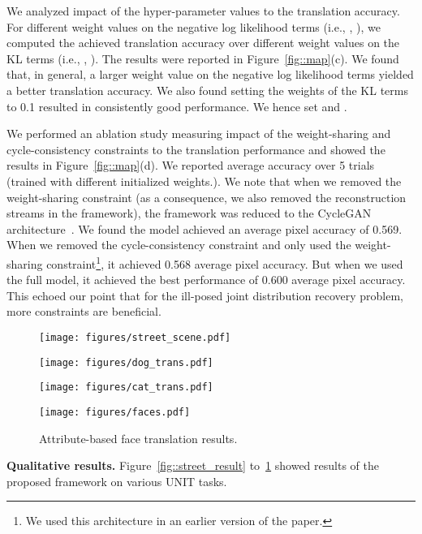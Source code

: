 \documentclass{article}
\begin{document}
We analyzed impact of the hyper-parameter values to the translation accuracy. For different weight values on the negative log likelihood terms (i.e., , ), we computed the achieved translation accuracy over different weight values on the KL terms (i.e., , ). The results were reported in Figure~\ref{fig::map}(c). We found that, in general, a larger weight value on the negative log likelihood terms yielded a better translation accuracy. We also found setting the weights of the KL terms to 0.1 resulted in consistently good performance. We hence set  and .

We performed an ablation study measuring impact of the weight-sharing and cycle-consistency constraints to the translation performance and showed the results in Figure~\ref{fig::map}(d). We reported average accuracy over 5 trials (trained with different initialized weights.). We note that when we removed the weight-sharing constraint (as a consequence, we also removed the reconstruction streams in the framework), the framework was reduced to the CycleGAN architecture~\cite{zhu2017unpaired,kim2017learning}. We found the model achieved an average pixel accuracy of 0.569. When we removed the cycle-consistency constraint and only used the weight-sharing constraint\footnote{We used this architecture in an earlier version of the paper.}, it achieved 0.568 average pixel accuracy. But when we used the full model, it achieved the best performance of 0.600 average pixel accuracy. This echoed our point that for the ill-posed joint distribution recovery problem, more constraints are beneficial.

\begin{figure}
\centering
\texttt{[image: figures/street\_scene.pdf]}
\vspace{-2mm}
\caption{\small Street scene image translation results. For each pair, left is input and right is the translated image.}
\label{fig::street_result}
\texttt{[image: figures/dog\_trans.pdf]}
\caption{\small Dog breed translation results.}
\label{fig::dog_result}
\texttt{[image: figures/cat\_trans.pdf]}
\caption{\small Cat species translation results.}
\label{fig::cat_result}
\texttt{[image: figures/faces.pdf]}
\caption{\small Attribute-based face translation results.}
\label{fig::face_result}
\end{figure}

{\bf Qualitative results.} Figure~\ref{fig::street_result} to~\ref{fig::face_result} showed  results of the proposed framework on various UNIT tasks.
\end{document}

